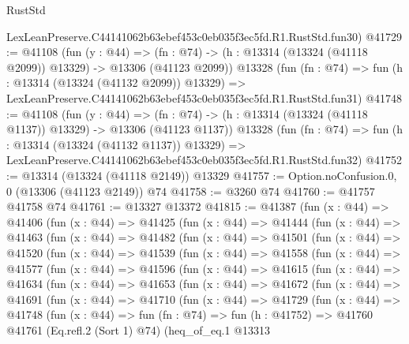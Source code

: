 \begin{lexlean}{RustStd}
\begin{coremodule}
    LexLeanPreserve.C44141062b63ebef453c0eb035f3ec5fd.R1.RustStd.fun30)
@41729 := @41108
    (fun (y : @44) =>
    (fn : @74) -> (h : @13314 (@13324 (@41118 @2099)) @13329) -> @13306 (@41123 @2099))
    @13328
    (fun (fn : @74) =>
    fun (h : @13314 (@13324 (@41132 @2099)) @13329) =>
    LexLeanPreserve.C44141062b63ebef453c0eb035f3ec5fd.R1.RustStd.fun31)
@41748 := @41108
    (fun (y : @44) =>
    (fn : @74) -> (h : @13314 (@13324 (@41118 @1137)) @13329) -> @13306 (@41123 @1137))
    @13328
    (fun (fn : @74) =>
    fun (h : @13314 (@13324 (@41132 @1137)) @13329) =>
    LexLeanPreserve.C44141062b63ebef453c0eb035f3ec5fd.R1.RustStd.fun32)
@41752 := @13314 (@13324 (@41118 @2149)) @13329
@41757 := Option.noConfusion.{0, 0} (@13306 (@41123 @2149)) @74
@41758 := @3260 @74
@41760 := @41757 @41758 @74
@41761 := @13327 @13372
@41815 := @41387
    (fun (x : @44) =>
    @41406
      (fun (x : @44) =>
      @41425
        (fun (x : @44) =>
        @41444
          (fun (x : @44) =>
          @41463
            (fun (x : @44) =>
            @41482
              (fun (x : @44) =>
              @41501
                (fun (x : @44) =>
                @41520
                  (fun (x : @44) =>
                  @41539
                    (fun (x : @44) =>
                    @41558
                      (fun (x : @44) =>
                      @41577
                        (fun (x : @44) =>
                        @41596
                          (fun (x : @44) =>
                          @41615
                            (fun (x : @44) =>
                            @41634
                              (fun (x : @44) =>
                              @41653
                                (fun (x : @44) =>
                                @41672
                                  (fun (x : @44) =>
                                  @41691
                                    (fun (x : @44) =>
                                    @41710
                                      (fun (x : @44) =>
                                      @41729
                                        (fun (x : @44) =>
                                        @41748
                                          (fun (x : @44) =>
                                          fun (fn : @74) =>
                                          fun (h : @41752) =>
                                          @41760
                                            @41761
                                            (Eq.refl.{2} (Sort 1) @74)
                                            (heq_of_eq.{1}
                                              @13313

\end{coremodule}
\end{lexlean}
